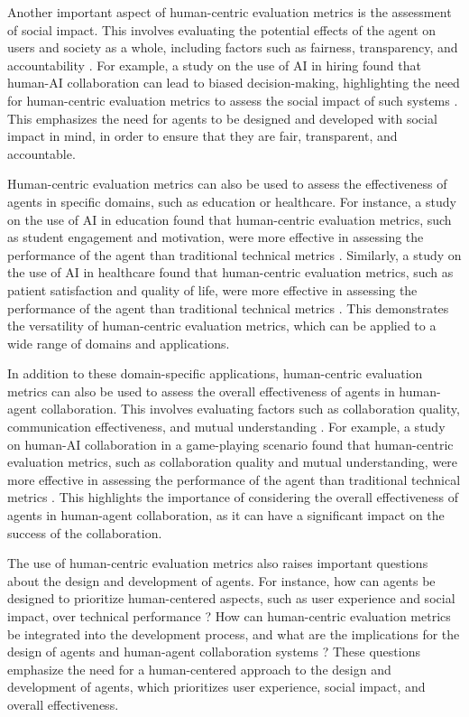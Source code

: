 \documentclass[11pt]{article}
\begin{document}
Another important aspect of human-centric evaluation metrics is the assessment of social impact. This involves evaluating the potential effects of the agent on users and society as a whole, including factors such as fairness, transparency, and accountability \cite{ref207}. For example, a study on the use of AI in hiring found that human-AI collaboration can lead to biased decision-making, highlighting the need for human-centric evaluation metrics to assess the social impact of such systems \cite{ref208}. This emphasizes the need for agents to be designed and developed with social impact in mind, in order to ensure that they are fair, transparent, and accountable.

Human-centric evaluation metrics can also be used to assess the effectiveness of agents in specific domains, such as education or healthcare. For instance, a study on the use of AI in education found that human-centric evaluation metrics, such as student engagement and motivation, were more effective in assessing the performance of the agent than traditional technical metrics \cite{ref209}. Similarly, a study on the use of AI in healthcare found that human-centric evaluation metrics, such as patient satisfaction and quality of life, were more effective in assessing the performance of the agent than traditional technical metrics \cite{ref210}. This demonstrates the versatility of human-centric evaluation metrics, which can be applied to a wide range of domains and applications.

In addition to these domain-specific applications, human-centric evaluation metrics can also be used to assess the overall effectiveness of agents in human-agent collaboration. This involves evaluating factors such as collaboration quality, communication effectiveness, and mutual understanding \cite{ref211}. For example, a study on human-AI collaboration in a game-playing scenario found that human-centric evaluation metrics, such as collaboration quality and mutual understanding, were more effective in assessing the performance of the agent than traditional technical metrics \cite{ref212}. This highlights the importance of considering the overall effectiveness of agents in human-agent collaboration, as it can have a significant impact on the success of the collaboration.

The use of human-centric evaluation metrics also raises important questions about the design and development of agents. For instance, how can agents be designed to prioritize human-centered aspects, such as user experience and social impact, over technical performance \cite{ref213}? How can human-centric evaluation metrics be integrated into the development process, and what are the implications for the design of agents and human-agent collaboration systems \cite{ref214}? These questions emphasize the need for a human-centered approach to the design and development of agents, which prioritizes user experience, social impact, and overall effectiveness.
\end{document}
